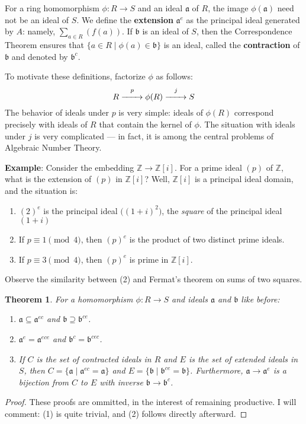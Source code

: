\documentclass[11pt]{article}
\newtheorem{theorem}{Theorem}
\renewcommand{\longrightarrow}{\xrightarrow{\hspace*{0.7cm}}}
\begin{document}
For a ring homomorphism $\phi : R \to S$ and an ideal $\mathfrak{a}$ of $R$, the image $\phi(\mathfrak{a})$ need not be an ideal of $S$. We define the \textbf{extension} $\mathfrak{a}^{e}$ as the principal ideal generated by $A$: namely, $\sum_{a \in R} (f(a))$. If $\mathfrak{b}$ is an ideal of $S$, then the Correspondence Theorem ensures that $\{ a \in R \mid \phi(a) \in \mathfrak{b} \}$ is an ideal, called the \textbf{contraction} of $\mathfrak{b}$ and denoted by $\mathfrak{b}^{c}$.

To motivate these definitions, factorize $\phi$ as follows:
\[
	R \stackrel{p}{\longrightarrow}\phi(R) \stackrel{j}{\longrightarrow} S
\]
The behavior of ideals under $p$ is very simple: ideals of $\phi(R)$ correspond precisely with ideals of $R$ that contain the kernel of $\phi$. The situation with ideals under $j$ is very complicated --- in fact, it is among the central problems of Algebraic Number Theory.

\textbf{Example}: Consider the embedding $\mathbb{Z} \to \mathbb{Z}[i]$. For a prime ideal $(p)$ of $\mathbb{Z}$, what is the extension of $(p)$ in $\mathbb{Z}[i]$? Well, $\mathbb{Z}[i]$ is a principal ideal domain, and the situation is:
\begin{enumerate}
	\item $(2)^{e}$ is the principal ideal $\Big( (1 + i)^{2} \Big)$, the \textit{square} of the principal ideal $(1 + i)$
	\item If $p \equiv 1 \pmod{4}$, then $(p)^{e}$ is the product of two distinct prime ideals.
	\item If $p \equiv 3 \pmod{4}$, then $(p)^{e}$ is prime in $\mathbb{Z}[i]$.
\end{enumerate}
Observe the similarity between (2) and Fermat's theorem on sums of two squares.

\begin{adjustwidth}{0.5cm}{}
	\begin{theorem}
		For a homomorphism $\phi : R \to S$ and ideals $\mathfrak{a}$ and $\mathfrak{b}$ like before:
		\begin{enumerate}
			\item $\mathfrak{a} \subseteq \mathfrak{a}^{ec}$ and $\mathfrak{b} \supseteq \mathfrak{b}^{ce}$.
			\item $\mathfrak{a}^{e} = \mathfrak{a}^{ece}$ and $\mathfrak{b}^{c} = \mathfrak{b}^{cec}$.
			\item If $C$ is the set of contracted ideals in $R$ and $E$ is the set of extended ideals in $S$, then $C = \{ \mathfrak{a} \mid \mathfrak{a}^{ec} = \mathfrak{a} \}$ and $E = \{ \mathfrak{b} \mid \mathfrak{b}^{ce} = \mathfrak{b} \}$. Furthermore, $\mathfrak{a} \to \mathfrak{a}^{e}$ is a bijection from $C$ to $E$ with inverse $\mathfrak{b} \to \mathfrak{b}^{c}$.
		\end{enumerate}
	\end{theorem}
	\begin{proof}
		These proofs are ommitted, in the interest of remaining productive. I will comment: (1) is quite trivial, and (2) follows directly afterward.
	\end{proof}
\end{adjustwidth}
\end{document}
